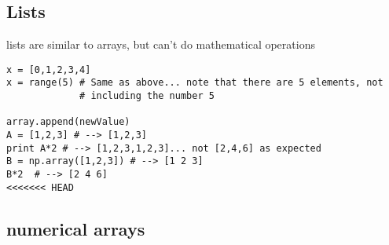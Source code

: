\documentclass{article}
\begin{document}
\subsection{Lists}

lists are similar to arrays, but can't do mathematical operations
\begin{verbatim}
x = [0,1,2,3,4]
x = range(5) # Same as above... note that there are 5 elements, not
             # including the number 5

array.append(newValue)
A = [1,2,3] # --> [1,2,3]
print A*2 # --> [1,2,3,1,2,3]... not [2,4,6] as expected
B = np.array([1,2,3]) # --> [1 2 3]
B*2  # --> [2 4 6]
<<<<<<< HEAD
\end{verbatim}

\subsection{numerical arrays}
\end{document}
